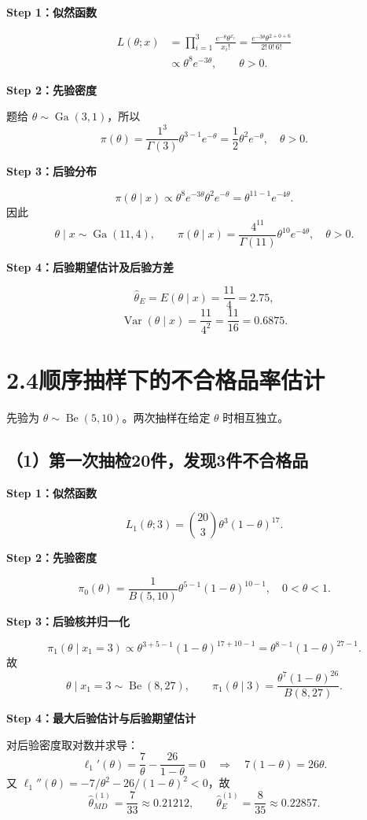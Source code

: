 \documentclass[UTF8,zihao=-4]{ctexart}
\newcommand{\step}[1]{\par\medskip\noindent\textbf{#1}\par\nopagebreak}
\newcommand{\Be}{\operatorname{Be}}
\newcommand{\Ga}{\operatorname{Ga}}
\newcommand{\Var}{\operatorname{Var}}
\begin{document}
\step{Step 1：似然函数}
\begin{align*}
L(\theta;x)
&=\prod_{i=1}^3\frac{e^{-\theta}\theta^{x_i}}{x_i!}
=\frac{e^{-3\theta}\theta^{2+0+6}}{2!\,0!\,6!}\\
&\propto\theta^8e^{-3\theta},\qquad\theta>0.
\end{align*}
\step{Step 2：先验密度}
题给 $\theta\sim\Ga(3,1)$，所以
\[
\pi(\theta)=\frac{1^3}{\Gamma(3)}\theta^{3-1}e^{-\theta}
=\frac12\theta^2e^{-\theta},\quad\theta>0.
\]
\step{Step 3：后验分布}
\[
\pi(\theta\mid x)\propto\theta^8e^{-3\theta}\theta^2e^{-\theta}
=\theta^{11-1}e^{-4\theta}.
\]
因此
\[
\boxed{\theta\mid x\sim\Ga(11,4),}
\qquad
\pi(\theta\mid x)=\frac{4^{11}}{\Gamma(11)}\theta^{10}e^{-4\theta},\quad\theta>0.
\]
\step{Step 4：后验期望估计及后验方差}
\[
\boxed{\hat\theta_E=E(\theta\mid x)=\frac{11}{4}=2.75,}
\]
\[
\boxed{\Var(\theta\mid x)=\frac{11}{4^2}=\frac{11}{16}=0.6875.}
\]

\section*{2.4\quad 顺序抽样下的不合格品率估计}
先验为 $\theta\sim\Be(5,10)$。两次抽样在给定 $\theta$ 时相互独立。

\subsection*{（1）第一次抽检20件，发现3件不合格品}
\step{Step 1：似然函数}
\[
L_1(\theta;3)=\binom{20}{3}\theta^3(1-\theta)^{17}.
\]
\step{Step 2：先验密度}
\[
\pi_0(\theta)=\frac1{B(5,10)}\theta^{5-1}(1-\theta)^{10-1},\quad0<\theta<1.
\]
\step{Step 3：后验核并归一化}
\[
\pi_1(\theta\mid x_1=3)\propto\theta^{3+5-1}(1-\theta)^{17+10-1}
=\theta^{8-1}(1-\theta)^{27-1}.
\]
故
\[
\theta\mid x_1=3\sim\Be(8,27),\qquad
\pi_1(\theta\mid3)=\frac{\theta^7(1-\theta)^{26}}{B(8,27)}.
\]
\step{Step 4：最大后验估计与后验期望估计}
对后验密度取对数并求导：
\[
\ell_1'(\theta)=\frac7\theta-\frac{26}{1-\theta}=0
\quad\Longrightarrow\quad7(1-\theta)=26\theta.
\]
又 $\ell_1''(\theta)=-7/\theta^2-26/(1-\theta)^2<0$，故
\[
\boxed{\hat\theta_{MD}^{(1)}=\frac7{33}\approx0.21212,\qquad
\hat\theta_E^{(1)}=\frac8{35}\approx0.22857.}
\]
\end{document}
